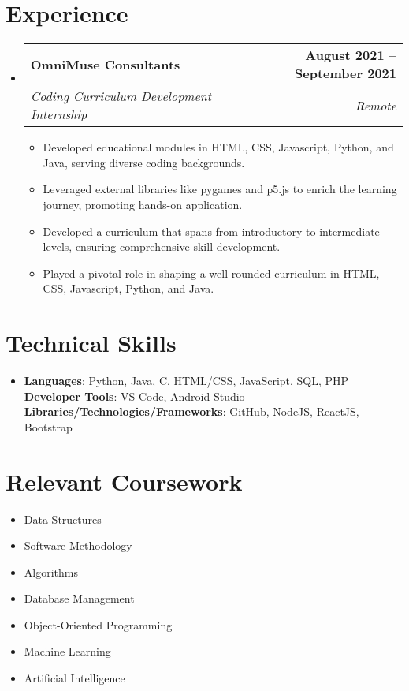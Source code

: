 \documentclass[letterpaper,11pt]{article}
\makeatletter
\newcommand{\resumeItem}[1]{
  \item\small{
    {#1 \vspace{-2pt}}
  }
}
\newcommand{\resumeSubheading}[4]{
  \vspace{-2pt}\item
    \begin{tabular*}{1.0\textwidth}[t]{l@{\extracolsep{\fill}}r}
      \textbf{#1} & \textbf{\small #2} \\
      \textit{\small#3} & \textit{\small #4} \\
    \end{tabular*}\vspace{-7pt}
}
\newcommand{\resumeSubHeadingListStart}{\begin{itemize}[leftmargin=0.0in, label={}]}
\newcommand{\resumeSubHeadingListEnd}{\end{itemize}}
\newcommand{\resumeItemListStart}{\begin{itemize}}
\newcommand{\resumeItemListEnd}{\end{itemize}\vspace{-5pt}}
\makeatother
\begin{document}
\section{Experience}
\resumeSubHeadingListStart

\resumeSubheading
{OmniMuse Consultants}{August 2021 -- September 2021}
{Coding Curriculum Development Internship}{Remote}
\resumeItemListStart
\resumeItem{Developed educational modules in HTML, CSS, Javascript, Python, and Java, serving diverse coding backgrounds.}
\resumeItem{Leveraged external libraries like pygames and p5.js to enrich the learning journey, promoting hands-on application.}
\resumeItem{Developed a curriculum that spans from introductory to intermediate levels, ensuring comprehensive skill development.}
\resumeItem{Played a pivotal role in shaping a well-rounded curriculum in HTML, CSS, Javascript, Python, and Java.}
\resumeItemListEnd

\resumeSubHeadingListEnd
\vspace{-16pt}




\section{Technical Skills}
\begin{itemize}[leftmargin=0.15in, label={}]
  \item{\textbf{Languages}{: Python, Java, C, HTML/CSS, JavaScript, SQL, PHP} \\
        \textbf{Developer Tools}{: VS Code, Android Studio} \\
        \textbf{Libraries/Technologies/Frameworks}{: GitHub, NodeJS, ReactJS, Bootstrap}
        }
\end{itemize}
\vspace{-16pt}


\section{Relevant Coursework}
\begin{multicols}{4}
  \begin{itemize}[itemsep=-5pt, parsep=3pt]
    \item\small Data Structures
    \item Software Methodology
    \item Algorithms
    \item Database Management
    \item Object-Oriented Programming
    \item Machine Learning
    \item Artificial Intelligence
  \end{itemize}
\end{multicols}
\vspace*{2.0\multicolsep}
\end{document}
